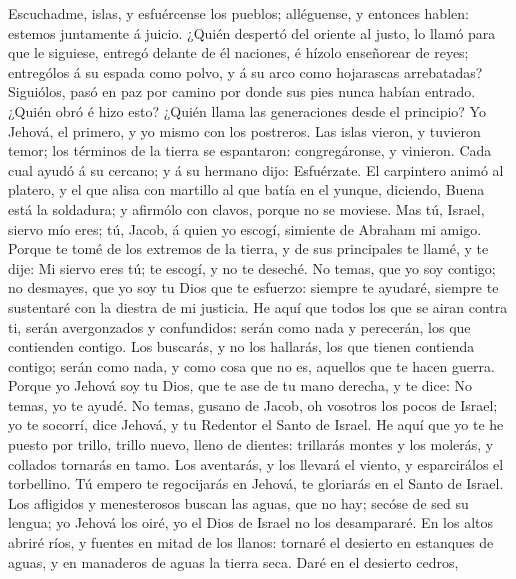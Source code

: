  Escuchadme, islas, y esfuércense los pueblos; alléguense,
y entonces hablen: estemos juntamente á juicio.  ¿Quién
despertó del oriente al justo, lo llamó para que le siguiese, entregó
delante de él naciones, é hízolo enseñorear de reyes; entrególos á su
espada como polvo, y á su arco como hojarascas arrebatadas?
 Siguiólos, pasó en paz por camino por donde sus pies
nunca habían entrado.  ¿Quién obró é hizo esto? ¿Quién
llama las generaciones desde el principio? Yo Jehová, el primero, y yo
mismo con los postreros.  Las islas vieron, y tuvieron
temor; los términos de la tierra se espantaron: congregáronse, y
vinieron.  Cada cual ayudó á su cercano; y á su hermano
dijo: Esfuérzate.  El carpintero animó al platero, y el
que alisa con martillo al que batía en el yunque, diciendo, Buena está
la soldadura; y afirmólo con clavos, porque no se moviese.
 Mas tú, Israel, siervo mío eres; tú, Jacob, á quien yo
escogí, simiente de Abraham mi amigo.  Porque te tomé de
los extremos de la tierra, y de sus principales te llamé, y te dije: Mi
siervo eres tú; te escogí, y no te deseché.  No temas,
que yo soy contigo; no desmayes, que yo soy tu Dios que te esfuerzo:
siempre te ayudaré, siempre te sustentaré con la diestra de mi justicia.
 He aquí que todos los que se airan contra ti, serán
avergonzados y confundidos: serán como nada y perecerán, los que
contienden contigo.  Los buscarás, y no los hallarás, los
que tienen contienda contigo; serán como nada, y como cosa que no es,
aquellos que te hacen guerra.  Porque yo Jehová soy tu
Dios, que te ase de tu mano derecha, y te dice: No temas, yo te ayudé.
 No temas, gusano de Jacob, oh vosotros los pocos de
Israel; yo te socorrí, dice Jehová, y tu Redentor el Santo de Israel.
 He aquí que yo te he puesto por trillo, trillo nuevo,
lleno de dientes: trillarás montes y los molerás, y collados tornarás en
tamo.  Los aventarás, y los llevará el viento, y
esparcirálos el torbellino. Tú empero te regocijarás en Jehová, te
gloriarás en el Santo de Israel.  Los afligidos y
menesterosos buscan las aguas, que no hay; secóse de sed su lengua; yo
Jehová los oiré, yo el Dios de Israel no los desampararé.
 En los altos abriré ríos, y fuentes en mitad de los
llanos: tornaré el desierto en estanques de aguas, y en manaderos de
aguas la tierra seca.  Daré en el desierto cedros,
